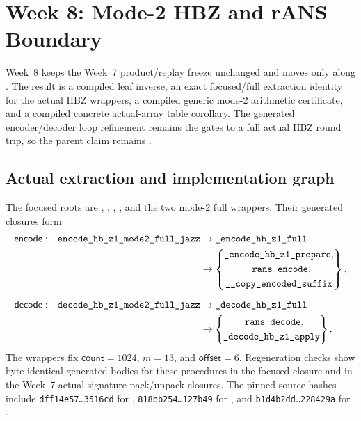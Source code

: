\section{Week 8: Mode-2 HBZ and rANS Boundary}

Week~8 keeps the Week~7 product/replay freeze unchanged and moves only along
.  The result is a compiled leaf inverse,
an exact focused/full extraction identity for the actual HBZ wrappers, a
compiled generic mode-2 arithmetic certificate, and a compiled concrete
actual-array table corollary.  The generated encoder/decoder loop refinement
remains the
gates to a full actual HBZ round trip, so the parent claim remains
.

\subsection*{Actual extraction and implementation graph}

The focused roots are
,
,
, , and the two
mode-2 full wrappers.  Their generated closures form
\[
\begin{aligned}
\mathsf{encode:}\quad \procname{encode_hb_z1_mode2_full_jazz}
 &\to \procname{_encode_hb_z1_full}\\
 &\to \left\{\begin{gathered}
       \procname{_encode_hb_z1_prepare},\\
       \procname{_rans_encode},\\
       \procname{__copy_encoded_suffix}
       \end{gathered}\right\},\\[2mm]
\mathsf{decode:}\quad \procname{decode_hb_z1_mode2_full_jazz}
 &\to \procname{_decode_hb_z1_full}\\
 &\to \left\{\begin{gathered}
       \procname{_rans_decode},\\
       \procname{_decode_hb_z1_apply}
       \end{gathered}\right\}.
\end{aligned}
\]
The wrappers fix $\mathsf{count}=1024$, $m=13$, and
$\mathsf{offset}=6$.  Regeneration checks show byte-identical generated
bodies for these procedures in the focused closure and in the Week~7 actual
signature pack/unpack closures.  The pinned source hashes include
\texttt{dff14e57\ldots3516cd} for ,
\texttt{818bb254\ldots127b49} for , and
\texttt{b1d4b2dd\ldots228429a} for .

